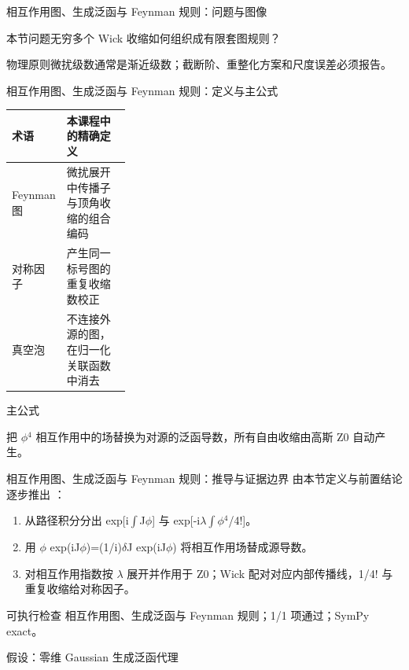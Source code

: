 \begin{frame}[t]{相互作用图、生成泛函与 Feynman 规则：问题与图像}
\footnotesize
\begin{block}{本节问题}无穷多个 Wick 收缩如何组织成有限套图规则？\end{block}
\begin{block}{物理原则}\quad 微扰级数通常是渐近级数；截断阶、重整化方案和尺度误差必须报告。\end{block}
\end{frame}

\begin{frame}[t]{相互作用图、生成泛函与 Feynman 规则：定义与主公式}
\footnotesize\begin{tabularx}{\linewidth}{p{0.30\linewidth}Y}
\toprule 术语 & 本课程中的精确定义\\\midrule
{} Feynman 图 & 微扰展开中传播子与顶角收缩的组合编码\\
 对称因子 & 产生同一标号图的重复收缩数校正\\
 真空泡 & 不连接外源的图，在归一化关联函数中消去\\
\bottomrule\end{tabularx}\vspace{0.15cm}
\begin{block}{ 主公式}\centering{}\end{block}
把 \ensuremath{\phi}\ensuremath{^{4}} 相互作用中的场替换为对源的泛函导数，所有自由收缩由高斯 Z0 自动产生。
\end{frame}

\begin{frame}[t]{相互作用图、生成泛函与 Feynman 规则：推导与证据边界}
\footnotesize
{}\quad 由本节定义与前置结论逐步推出 ：
\begin{enumerate}
\item 从路径积分分出 exp[i\ensuremath{\int}J\ensuremath{\phi}] 与 exp[-i\ensuremath{\lambda}\ensuremath{\int}\ensuremath{\phi}\ensuremath{^{4}}/\allowbreak{}4!]。
\item 用 \ensuremath{\phi} exp(iJ\ensuremath{\phi})=(1/\allowbreak{}i)\ensuremath{\delta}J exp(iJ\ensuremath{\phi}) 将相互作用场替成源导数。
\item 对相互作用指数按 \ensuremath{\lambda} 展开并作用于 Z0；Wick 配对对应内部传播线，1/\allowbreak{}4! 与重复收缩给对称因子。
\end{enumerate}\begin{block}{可执行检查}
\quad 相互作用图、生成泛函与 Feynman 规则；1/1 项通过；SymPy exact。
\par\scriptsize 假设：零维 Gaussian 生成泛函代理
\end{block}
\end{frame}

